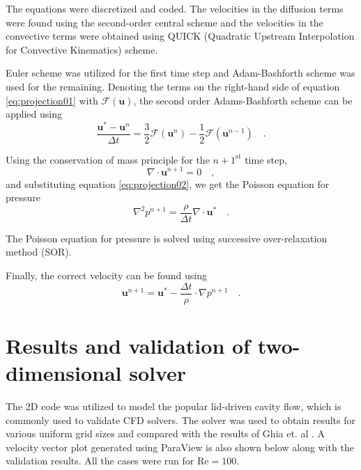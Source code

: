 \documentclass[12pt,a4paper,fleqn]{article}
\begin{document}
The equations were discretized and coded. The velocities in the diffusion terms were found using the second-order central scheme and the velocities in the convective terms were obtained using QUICK (Quadratic Upstream Interpolation for Convective Kinematics) scheme.

Euler scheme was utilized for the first time step and Adam-Bashforth scheme was used for the remaining. Denoting the terms on the right-hand side of equation \eqref{eq:projection01} with $\mathcal{F}(\mathbf{u})$, the second order Adams-Bashforth scheme can be applied using
\begin{equation}\label{eq:adams-bashforth}
\frac{\mathbf{u}^*-\mathbf{u}^n}{\Delta t} = \frac{3}{2}\mathcal{F}(\mathbf{u}^n)-\frac{1}{2}\mathcal{F}(\mathbf{u}^{n-1})\quad .
\end{equation}

Using the conservation of mass principle for the $n+1^{\text{st}}$ time step,
\begin{equation} \label{eq:continuity-n+1}
\nabla \cdot \mathbf{u}^{n+1} = 0 \quad ,
\end{equation}
and substituting equation \eqref{eq:projection02}, we get the Poisson equation for pressure
\begin{equation} \label{eq:poisson}
\nabla^2 p^{n+1} = \frac{\rho}{\Delta t}\nabla \cdot \mathbf{u}^* \quad .
\end{equation}

The Poisson equation for pressure is solved using successive over-relaxation method (SOR).

Finally, the correct velocity can be found using
\begin{equation}
\mathbf{u}^{n+1} = \mathbf{u}^* - \frac{\Delta t}{\rho}\cdot \nabla p^{n+1} \quad .
\end{equation}

\section{Results and validation of two-dimensional solver}

The 2D code was utilized to model the popular lid-driven cavity flow, which is commonly used to validate CFD solvers. The solver was used to obtain results for various uniform grid sizes and compared with the results of Ghia et. al \cite{GHIA1982387}. A velocity vector plot generated using ParaView is also shown below along with the validation results. All the cases were run for \(\text{Re}= 100\).
\end{document}
